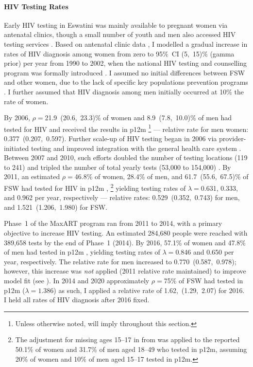 \paragraph{HIV Testing Rates}
Early HIV testing in Eswatini was mainly available to pregnant women via antenatal clinics,
though a small number of youth and men also accessed HIV testing services \cite{EswHPC1998,HSRC2004}.
Based on antenatal clinic data \cite{EswUNGASS2010},
I modelled a gradual increase in rates of HIV diagnosis among women
from zero to 95\%~CI (5,~15)\% (gamma prior) per year from 1990 to 2002,
when the national HIV testing and counselling program was formally introduced \cite{NERCHA2012}.
I assumed no initial differences between FSW and other women,
due to the lack of specific key populations prevention programs \cite{EswNASA2006}.
I further assumed that HIV diagnosis among men initially occurred at 10\% the rate of women.
\par
By 2006, $\rho = {}$21.9~(20.6,~23.3)\% of women and 8.9~(7.8,~10.0)\% of men
had tested for HIV and received the results in p12m \cite{SDHS2006}%
\footnote{Unless otherwise noted,  will imply
   throughout this section.}
--- relative rate for men \vs women: 0.377~(0.207,~0.597).
Further scale-up of HIV testing began in 2006 via provider-initiated testing
and improved integration with the general health care system \cite{NERCHA2012}.
Between 2007 and 2010, such efforts
doubled the number of testing locations (119 to 241) and
tripled the number of total yearly tests (53,000 to 154,000) \cite{NERCHA2009,NERCHA2012}.
By 2011, an estimated $\rho = {}$46.8\% of women, 28.4\% of men, and 61.7~(55.6,~67.5)\% of FSW
had tested for HIV in p12m \cite{SHIMS1T,Baral2014},%
\footnote{The adjustment for missing ages 15--17 in \cite{SHIMS1T} from 
  was applied to the reported 50.1\% of women and 31.7\% of men aged 18--49 who tested in p12m,
  assuming 20\% of women and 10\% of men aged 15--17 tested in p12m.}
yielding testing rates of $\lambda = {}$0.631, 0.333, and 0.962 per year, respectively
--- relative rates: 0.529~(0.352,~0.743) for men, and 1.521~(1.206,~1.980) for FSW.
\par
Phase~1 of the MaxART program \cite{MaxART1} ran from 2011 to 2014,
with a primary objective to increase HIV testing.
An estimated 284,680 people were reached with 389,658 tests by the end of Phase~1 (2014).
By 2016, 57.1\% of women and 47.8\% of men had tested in p12m \cite{SHIMS2},
yielding testing rates of $\lambda = {}$0.846 and 0.650 per year, respectively.
The relative rate for men increased to 0.770~(0.587,~0.978);
however, this increase was \emph{not} applied (2011 relative rate maintained)
to improve model fit (see ).
In 2014 \cite{EswKP2014} and 2020 \cite{EswIBBS2022}
approximately $\rho = {}$75\% of FSW had tested in p12m ($\lambda = 1.386$)
as such, I applied a relative rate of 1.62,~(1.29,~2.07) for 2016.
I held all rates of HIV diagnosis after 2016 fixed.
